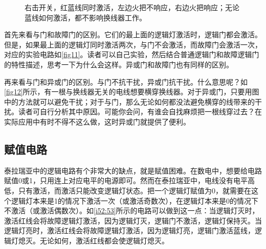 \begin{figure}[!ht]
\centering
{}
\qquad
{}
\caption{\protect{}右击开关，红蓝线同时激活，左边火把不响应，右边火把响应；\protect{}无论蓝线如何激活，都不影响换线器工作。}
\end{figure}

首先来看与门和故障门的区别。它们的最上面的逻辑灯激活时，逻辑门都会激活。但是，如果最上面的逻辑灯同时激活两次，与门不会激活，而故障门会激活一次，对应的实验电路如\autoref{fig11}。读者可以自己实验，然后结合普通逻辑门和故障逻辑门的特性描述，思考一下为什么会这样。异或门和故障门也有同样的区别。

再来看与门和异或门的区别。与门不抗干扰，异或门抗干扰。什么意思呢？如\autoref{fig12}所示，有一根与换线器无关的电线想要横穿换线器。对于异或门，只要用图中的方法就可以避免干扰；对于与门，那么无论如何都没法避免横穿的线带来的干扰。读者可自行分析其中原因。可能你会问，有谁会自找麻烦把一根线穿过去？在实际应用中有时不得不这么做，这时异或门就提供了便利。

\subsection{赋值电路}\label{sec14}

泰拉瑞亚中的逻辑电路有个非常大的缺点，就是赋值困难。在数电中，想要给电路赋值0或1，只用连上对应电平的电源即可。然而在泰拉瑞亚中，电线没有电平高低，只有激活，而激活只能改变逻辑灯状态。把一个逻辑灯赋值为0，就需要在这个逻辑灯本来是1的情况下激活一次（或激活奇数次），在逻辑灯本来是0的情况下不激活（或激活偶数次）。如\autoref{i52:53}所示的电路可以做到这一点：当逻辑灯灭时，激活红线会将故障逻辑灯激活，因为逻辑灯灭，逻辑门不激活，逻辑灯保持灭。当逻辑灯亮时，激活红线会将故障逻辑灯激活，因为逻辑灯亮，逻辑门激活蓝线，逻辑灯熄灭。无论如何，激活红线都会使逻辑灯熄灭。

